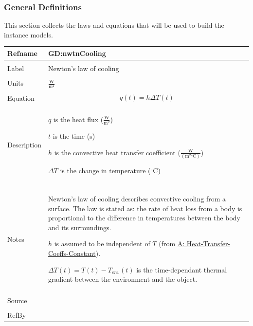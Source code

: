 \documentclass[12pt]{article}
\begin{document}
\subsubsection{General Definitions}
\label{Sec:GDs}
This section collects the laws and equations that will be used to build the instance models.

\vspace{\baselineskip}
\noindent
\begin{minipage}{\textwidth}
\begin{tabular}{>{\raggedright}p{}>{\raggedright\arraybackslash}p{}}
\toprule \textbf{Refname} & \textbf{GD:nwtnCooling}
\label{GD:nwtnCooling}
\\ \midrule \\
Label & Newton's law of cooling
        
\\ \midrule \\
Units & $\frac{\text{W}}{\text{m}^{2}}$
        
\\ \midrule \\
Equation & \begin{displaymath}
           q\left(t\right)=h ΔT\left(t\right)
           \end{displaymath}
\\ \midrule \\
Description & \begin{symbDescription}
              \item{$q$ is the heat flux ($\frac{\text{W}}{\text{m}^{2}}$)}
              \item{$t$ is the time (s)}
              \item{$h$ is the convective heat transfer coefficient ($\frac{\text{W}}{(\text{m}^{2}{}^{\circ}\text{C})}$)}
              \item{$ΔT$ is the change in temperature (${}^{\circ}$C)}
              \end{symbDescription}
\\ \midrule \\
Notes & Newton's law of cooling describes convective cooling from a surface. The law is stated as: the rate of heat loss from a body is proportional to the difference in temperatures between the body and its surroundings.
        
        $h$ is assumed to be independent of $T$ (from \hyperref[assumpHTCC]{A: Heat-Transfer-Coeffs-Constant}).
        
        $ΔT\left(t\right)=T\left(t\right)-{T_{env}}\left(t\right)$ is the time-dependant thermal gradient between the environment and the object.
        
\\ \midrule \\
Source & \cite[(pg. 8)]{incroperaEtAl2007}
         
\\ \midrule \\
RefBy & 
\\ \bottomrule
\end{tabular}
\end{minipage}
\end{document}
